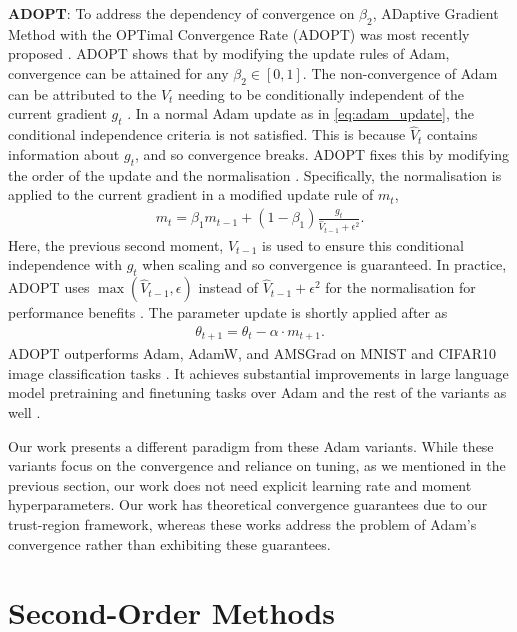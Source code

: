 \textbf{ADOPT}: To address the dependency of convergence on $\beta_2$, ADaptive Gradient Method with the OPTimal Convergence Rate (ADOPT) was most recently proposed \citep{taniguchi2024adopt}. ADOPT shows that by modifying the update rules of Adam, convergence can be attained for any $\beta_2 \in [0, 1]$. The non-convergence of Adam can be attributed to the $V_t$ needing to be conditionally independent of the current gradient $g_t$ \citep{taniguchi2024adopt}. In a normal Adam update as in \cref{eq:adam_update}, the conditional independence criteria is not satisfied. This is because $\hat{V}_t$ contains information about $g_t$, and so convergence breaks. 
ADOPT fixes this by modifying the order of the update and the normalisation \citep{taniguchi2024adopt}. Specifically, the normalisation is applied to the current gradient in a modified update rule of $m_t$, 
\begin{align}
    m_t = \beta_1 m_{t-1} + (1 - \beta_1) \frac{g_t}{\hat{V}_{t-1} + \epsilon^2}.
\end{align}
Here, the previous second moment, $V_{t-1}$ is used to ensure this conditional independence with $g_t$ when scaling and so convergence is guaranteed. In practice, ADOPT uses $\max(\hat{V}_{t-1}, \epsilon)$ instead of $\hat{V}_{t-1} + \epsilon^2$ for the normalisation for performance benefits \citep{taniguchi2024adopt}. The parameter update is shortly applied after as
\begin{align}
    \theta_{t+1} = \theta_{t} - \alpha \cdot m_{t+1}.
\end{align}
ADOPT outperforms Adam, AdamW, and AMSGrad on MNIST and CIFAR10 image classification tasks \citep{taniguchi2024adopt}.
It achieves substantial improvements in large language model pretraining and finetuning tasks over Adam and the rest of the variants as well \citep{taniguchi2024adopt}. 

Our work presents a different paradigm from these Adam variants. While these variants focus on the convergence and reliance on tuning, as we mentioned in the previous section, our work does not need explicit learning rate and moment hyperparameters. Our work has theoretical convergence guarantees due to our trust-region framework, whereas these works address the problem of Adam's convergence rather than exhibiting these guarantees.

\section{Second-Order Methods}
\label{sec:second_order_methods}

